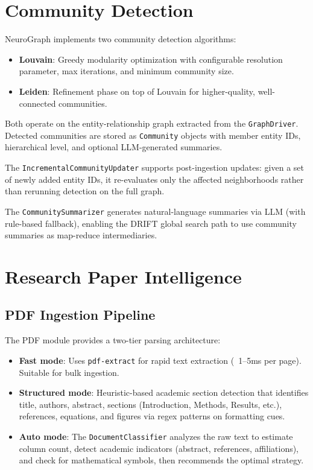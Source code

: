 \documentclass[11pt,a4paper,twocolumn]{article}
\begin{document}
\section{Community Detection}
\label{sec:community}

NeuroGraph implements two community detection algorithms:

\begin{itemize}[leftmargin=*]
  \item \textbf{Louvain}: Greedy modularity optimization with
    configurable resolution parameter, max iterations, and minimum
    community size.
  \item \textbf{Leiden}: Refinement phase on top of Louvain for
    higher-quality, well-connected communities.
\end{itemize}

Both operate on the entity-relationship graph extracted from the
\texttt{GraphDriver}. Detected communities are stored as
\texttt{Community} objects with member entity IDs, hierarchical
level, and optional LLM-generated summaries.

The \texttt{IncrementalCommunityUpdater} supports post-ingestion
updates: given a set of newly added entity IDs, it re-evaluates
only the affected neighborhoods rather than rerunning detection
on the full graph.

The \texttt{CommunitySummarizer} generates natural-language summaries
via LLM (with rule-based fallback), enabling the DRIFT global
search path to use community summaries as map-reduce intermediaries.

\section{Research Paper Intelligence}
\label{sec:research}

\subsection{PDF Ingestion Pipeline}

The PDF module provides a two-tier parsing architecture:

\begin{itemize}[leftmargin=*]
  \item \textbf{Fast mode}: Uses \texttt{pdf-extract} for rapid
    text extraction (~1--5ms per page). Suitable for bulk ingestion.
  \item \textbf{Structured mode}: Heuristic-based academic section
    detection that identifies title, authors, abstract, sections
    (Introduction, Methods, Results, etc.), references, equations,
    and figures via regex patterns on formatting cues.
  \item \textbf{Auto mode}: The \texttt{DocumentClassifier} analyzes
    the raw text to estimate column count, detect academic indicators
    (abstract, references, affiliations), and check for mathematical
    symbols, then recommends the optimal strategy.
\end{itemize}
\end{document}

